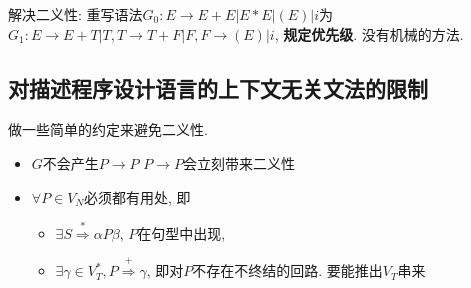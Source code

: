             解决二义性: 重写语法$G_0:E\to E+E|E*E|(E)|i$为$G_1:E\to E+T|T, T\to T+F|F, F\to(E)|i$, \textbf{规定优先级}. 没有机械的方法.

    \subsection{对描述程序设计语言的上下文无关文法的限制}

        做一些简单的约定来避免二义性.

        \begin{itemize}
            \item $G$不会产生$P\to P$ \hfill $P\to P$会立刻带来二义性
            \item $\forall P\in V_N$必须都有用处, 即
                \begin{itemize}
                    \item $\exists S\stackrel{*}{\Rightarrow} \alpha P\beta$, $P$在句型中出现,
                    \item $\exists \gamma\in V_T^*, P\stackrel{+}{\Rightarrow}\gamma$, 即对$P$不存在不终结的回路. \hfill 要能推出$V_T$串来
                \end{itemize}
        \end{itemize}
